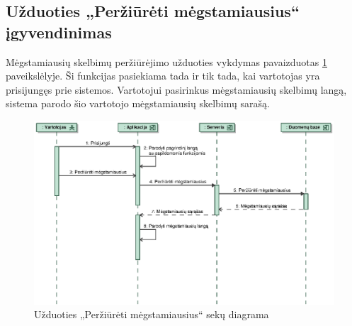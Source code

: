 \documentclass[12pt]{article}
\begin{document}
	\subsection{Užduoties „Peržiūrėti mėgstamiausius“ įgyvendinimas}
	Mėgstamiausių skelbimų peržiūrėjimo užduoties vykdymas pavaizduotas \ref{ViewFavSeq} paveikslėlyje. Ši funkcijas pasiekiama tada ir tik tada, kai vartotojas yra prisijungęs prie sistemos. Vartotojui pasirinkus mėgstamiausių skelbimų langą, sistema parodo šio vartotojo mėgstamiausių skelbimų sarašą.
	\begin{figure}[h]
		\begin{center}
			\includegraphics[width=\textwidth]{PerziuretiMegstamiausius.eps}
			\caption{Užduoties „Peržiūrėti mėgstamiausius“ sekų diagrama\label{ViewFavSeq}}
		\end{center}
	\end{figure}
	
	\pagebreak
	
\end{document}
